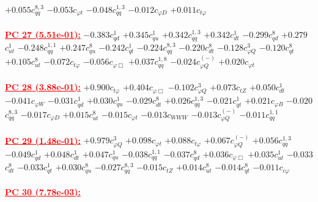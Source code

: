 \documentclass{article}
\begin{document}
{$+0.055$}{\rm $c_{qq}^{8,3}$}
{$-0.053$}{\rm $c_{\varphi t}$}
{$-0.048$}{\rm $c_{qq}^{1,3}$}
{$-0.012$}{\rm $c_{\varphi D}$}
{$+0.011$}{\rm $c_{t \varphi}$}
 \nonumber \\ \nonumber \\
\noindent \textcolor{red}{\underline{\bf{PC 27} (5.51e-01):}}
{$-0.383$}{\rm $c_{qd}^{1}$}
{$+0.345$}{\rm $c_{qu}^{1}$}
{$+0.342$}{\rm $c_{qq}^{1,3}$}
{$+0.342$}{\rm $c_{dt}^{1}$}
{$-0.299$}{\rm $c_{qd}^{8}$}
{$+0.279$}{\rm $c_{ut}^{1}$}
{$-0.248$}{\rm $c_{qq}^{1,1}$}
{$+0.247$}{\rm $c_{qu}^{8}$}
{$-0.242$}{\rm $c_{qt}^{1}$}
{$-0.224$}{\rm $c_{qq}^{8,3}$}
{$-0.220$}{\rm $c_{dt}^{8}$}
{$-0.128$}{\rm $c_{\varphi Q}^{3}$}
{$-0.120$}{\rm $c_{qt}^{8}$}
{$+0.105$}{\rm $c_{ut}^{8}$}
{$-0.072$}{\rm $c_{t \varphi}$}
{$-0.056$}{\rm $c_{\varphi \Box}$}
{$+0.037$}{\rm $c_{qq}^{1,8}$}
{$-0.024$}{\rm $c_{\varphi Q}^{(-)}$}
{$+0.020$}{\rm $c_{\varphi t}$}
 \nonumber \\ \nonumber \\
\noindent \textcolor{red}{\underline{\bf{PC 28} (3.88e-01):}}
{$+0.900$}{\rm $c_{t \varphi}$}
{$+0.404$}{\rm $c_{\varphi \Box}$}
{$-0.102$}{\rm $c_{\varphi Q}^{3}$}
{$+0.073$}{\rm $c_{tZ}$}
{$+0.050$}{\rm $c_{dt}^{1}$}
{$-0.041$}{\rm $c_{\varphi W}$}
{$-0.031$}{\rm $c_{qd}^{1}$}
{$+0.030$}{\rm $c_{qu}^{1}$}
{$-0.029$}{\rm $c_{dt}^{8}$}
{$+0.026$}{\rm $c_{qq}^{1,3}$}
{$-0.021$}{\rm $c_{qt}^{1}$}
{$+0.021$}{\rm $c_{\varphi B}$}
{$-0.020$}{\rm $c_{qq}^{8,3}$}
{$-0.017$}{\rm $c_{\varphi D}$}
{$+0.015$}{\rm $c_{ut}^{8}$}
{$-0.015$}{\rm $c_{\varphi t}$}
{$-0.013$}{\rm $c_{WWW}$}
{$-0.013$}{\rm $c_{\varphi Q}^{(-)}$}
{$-0.011$}{\rm $c_{qq}^{1,1}$}
 \nonumber \\ \nonumber \\
\noindent \textcolor{red}{\underline{\bf{PC 29} (1.48e-01):}}
{$+0.979$}{\rm $c_{\varphi Q}^{3}$}
{$+0.098$}{\rm $c_{\varphi t}$}
{$+0.088$}{\rm $c_{t \varphi}$}
{$+0.067$}{\rm $c_{\varphi Q}^{(-)}$}
{$+0.056$}{\rm $c_{qq}^{1,3}$}
{$-0.049$}{\rm $c_{qd}^{1}$}
{$+0.048$}{\rm $c_{dt}^{1}$}
{$+0.047$}{\rm $c_{qu}^{1}$}
{$-0.038$}{\rm $c_{qq}^{1,1}$}
{$-0.037$}{\rm $c_{qd}^{8}$}
{$+0.036$}{\rm $c_{\varphi \Box}$}
{$+0.035$}{\rm $c_{ut}^{1}$}
{$-0.033$}{\rm $c_{dt}^{8}$}
{$-0.033$}{\rm $c_{qt}^{1}$}
{$+0.030$}{\rm $c_{qu}^{8}$}
{$-0.027$}{\rm $c_{qq}^{8,3}$}
{$-0.015$}{\rm $c_{tZ}$}
{$+0.014$}{\rm $c_{ut}^{8}$}
{$-0.014$}{\rm $c_{qt}^{8}$}
{$-0.011$}{\rm $c_{c \varphi}$}
 \nonumber \\ \nonumber \\
\noindent \textcolor{red}{\underline{\bf{PC 30} (7.78e-03):}}
\end{document}

